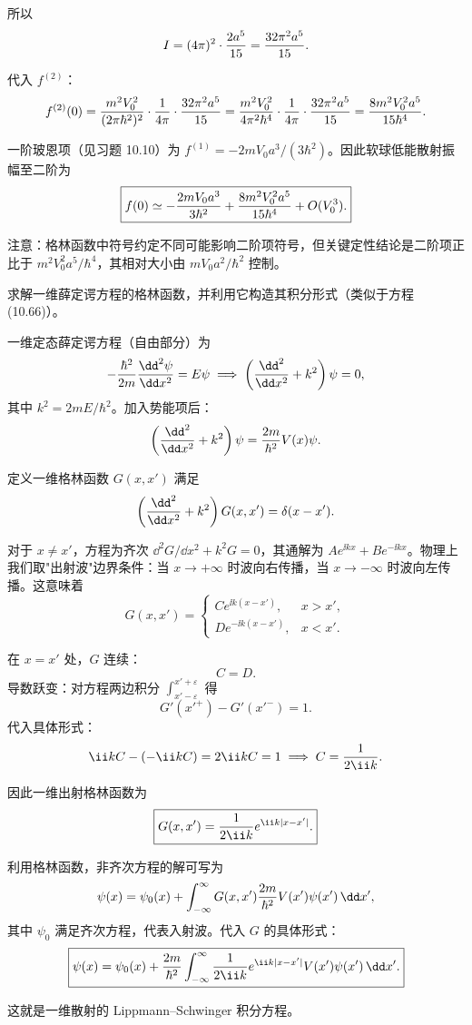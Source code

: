 \begin{solution}
所以
\[
I=(4\pi)^2\cdot{2a^5\over15}={32\pi^2 a^5\over15}.
\]

代入 $f^{(2)}$：
\[
f^{(2)}(0)={m^2V_0^2\over(2\pi\hbar^2)^2}\cdot{1\over4\pi}\cdot{32\pi^2 a^5\over15}
={m^2V_0^2\over4\pi^2\hbar^4}\cdot{1\over4\pi}\cdot{32\pi^2 a^5\over15}
={8m^2V_0^2a^5\over15\hbar^4}.
\]

一阶玻恩项（见习题 10.10）为 $f^{(1)}=-2mV_0a^3/(3\hbar^2)$。因此软球低能散射振幅至二阶为
\[
\boxed{f(0)\simeq-{2mV_0a^3\over3\hbar^2}+{8m^2V_0^2a^5\over15\hbar^4}+O(V_0^3).}
\]

注意：格林函数中符号约定不同可能影响二阶项符号，但关键定性结论是二阶项正比于 $m^2V_0^2a^5/\hbar^4$，其相对大小由 $mV_0a^2/\hbar^2$ 控制。
\end{solution}

\begin{question}
求解一维薛定谔方程的格林函数，并利用它构造其积分形式（类似于方程 (10.66)）。

\par\smallskip
{}

\end{question}
\begin{solution}
一维定态薛定谔方程（自由部分）为
\[
-{\hbar^2\over2m}{\dd^2\psi\over\dd x^2}=E\psi
\;\Longrightarrow\;
\left({\dd^2\over\dd x^2}+k^2\right)\psi=0,
\]
其中 $k^2=2mE/\hbar^2$。加入势能项后：
\[
\left({\dd^2\over\dd x^2}+k^2\right)\psi={2m\over\hbar^2}V(x)\psi.
\]

定义一维格林函数 $G(x,x')$ 满足
\[
\left({\dd^2\over\dd x^2}+k^2\right)G(x,x')=\delta(x-x').
\]

对于 $x\neq x'$，方程为齐次 $\dd^2G/\dd x^2+k^2G=0$，其通解为 $Ae^{\ii kx}+Be^{-\ii kx}$。物理上我们取"出射波"边界条件：当 $x\to+\infty$ 时波向右传播，当 $x\to-\infty$ 时波向左传播。这意味着
\[
G(x,x')=\begin{cases}
C e^{\ii k(x-x')}, & x>x',\\
D e^{-\ii k(x-x')}, & x<x'.
\end{cases}
\]

在 $x=x'$ 处，$G$ 连续：
\[
C=D.
\]
导数跃变：对方程两边积分 $\int_{x'-\varepsilon}^{x'+\varepsilon}$ 得
\[
G'(x'^+)-G'(x'^-)=1.
\]
代入具体形式：
\[
\ii k C-(-\ii k C)=2\ii k C=1\;\Longrightarrow\;C={1\over2\ii k}.
\]

因此一维出射格林函数为
\[
\boxed{G(x,x')={1\over2\ii k}e^{\ii k|x-x'|}.}
\]

利用格林函数，非齐次方程的解可写为
\[
\psi(x)=\psi_0(x)+\int_{-\infty}^{\infty}G(x,x'){2m\over\hbar^2}V(x')\psi(x')\,\dd x',
\]
其中 $\psi_0$ 满足齐次方程，代表入射波。代入 $G$ 的具体形式：
\[
\boxed{\psi(x)=\psi_0(x)+{2m\over\hbar^2}\int_{-\infty}^{\infty}{1\over2\ii k}e^{\ii k|x-x'|}V(x')\psi(x')\,\dd x'.}
\]

这就是一维散射的 Lippmann--Schwinger 积分方程。
\end{solution}

